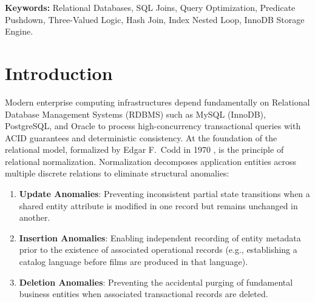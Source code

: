 \documentclass[10pt,twocolumn,letterpaper]{article}
\begin{document}
\vspace{1.0em}
\noindent\textbf{Keywords:} Relational Databases, SQL Joins, Query Optimization, Predicate Pushdown, Three-Valued Logic, Hash Join, Index Nested Loop, InnoDB Storage Engine.
\vspace{1.2em}

\section{Introduction}
\label{sec:intro}

Modern enterprise computing infrastructures depend fundamentally on Relational Database Management Systems (RDBMS) such as MySQL (InnoDB), PostgreSQL, and Oracle to process high-concurrency transactional queries with ACID guarantees and deterministic consistency. At the foundation of the relational model, formalized by Edgar F.~Codd in 1970 \cite{codd1970}, is the principle of relational normalization. Normalization decomposes application entities across multiple discrete relations to eliminate structural anomalies:
\begin{enumerate}
    \item \textbf{Update Anomalies}: Preventing inconsistent partial state transitions when a shared entity attribute is modified in one record but remains unchanged in another.
    \item \textbf{Insertion Anomalies}: Enabling independent recording of entity metadata prior to the existence of associated operational records (e.g., establishing a catalog language before films are produced in that language).
    \item \textbf{Deletion Anomalies}: Preventing the accidental purging of fundamental business entities when associated transactional records are deleted.
\end{enumerate}
\end{document}
